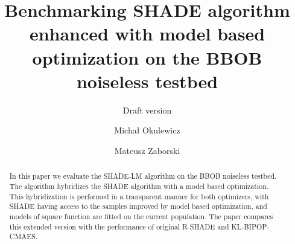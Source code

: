 \documentclass[sigconf]{acmart}
\begin{document}
\title{Benchmarking SHADE algorithm enhanced with model based optimization on the BBOB noiseless testbed}
\renewcommand{\shorttitle}{SHADE algorithm enhanced with model based optimization on BBOB}
\subtitle{Draft version}



\author{Michał Okulewicz}
%
\author{Mateusz Zaborski}
%
%
%
%
%
%

\renewcommand{\shortauthors}{Firstname Lastname et. al.}


\begin{abstract}
 In this paper we evaluate the SHADE-LM algorithm on the BBOB noiseless testbed.
 The algorithm hybridizes the SHADE algorithm with a model based optimization.
 This hybridization is performed in a transparent manner for both optimizers,
 with SHADE having access to the samples improved by model based optimization,
 and models of square function are fitted on the current population.
 The paper compares this extended version with the performance of original
 R-SHADE and KL-BIPOP-CMAES.
\end{abstract}
\end{document}
